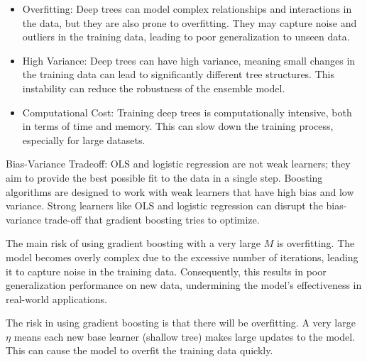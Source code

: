 \documentclass[12pt]{article}
\begin{document}
\begin{enumerate}
\begin{itemize}
    \item Overfitting: Deep trees can model complex relationships and interactions in the data, but they are also prone to overfitting. They may capture noise and outliers in the training data, leading to poor generalization to unseen data.
    \item High Variance: Deep trees can have high variance, meaning small changes in the training data can lead to significantly different tree structures. This instability can reduce the robustness of the ensemble model.
    \item Computational Cost: Training deep trees is computationally intensive, both in terms of time and memory. This can slow down the training process, especially for large datasets.
\end{itemize}


Bias-Variance Tradeoff: OLS and logistic regression are not weak learners; they aim to provide the best possible fit to the data in a single step. Boosting algorithms are designed to work with weak learners that have high bias and low variance. Strong learners like OLS and logistic regression can disrupt the bias-variance trade-off that gradient boosting tries to optimize.


The main risk of using gradient boosting with a very large \(M\) is overfitting. The model becomes overly complex due to the excessive number of iterations, leading it to capture noise in the training data. Consequently, this results in poor generalization performance on new data, undermining the model's effectiveness in real-world applications.


The risk in using gradient boosting is that there will be overfitting. A very large \(\eta\) means each new base learner (shallow tree) makes large updates to the model. This can cause the model to overfit the training data quickly.

\end{enumerate}
\end{document}
